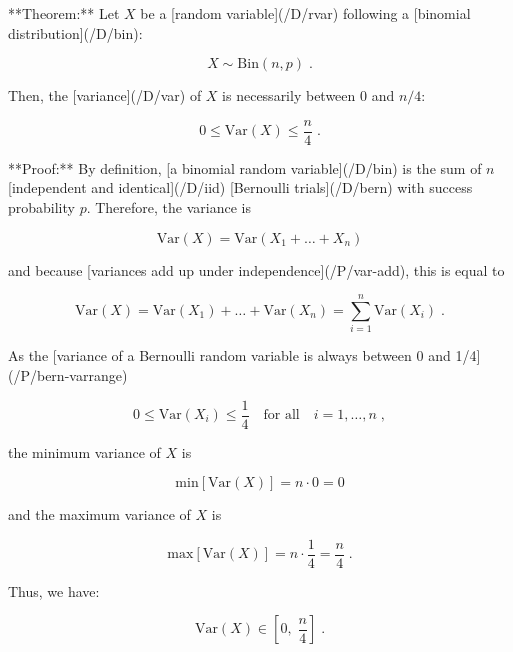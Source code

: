 \documentclass[a4paper,12pt]{article}
\begin{document}
**Theorem:** Let $X$ be a [random variable](/D/rvar) following a [binomial distribution](/D/bin):

$$ \label{eq:bin}
X \sim \mathrm{Bin}(n,p) \; .
$$

Then, the [variance](/D/var) of $X$ is necessarily between 0 and $n/4$:

$$ \label{eq:bin-var-range}
0 \leq \mathrm{Var}(X) \leq \frac{n}{4} \; .
$$


**Proof:** By definition, [a binomial random variable](/D/bin) is the sum of $n$ [independent and identical](/D/iid) [Bernoulli trials](/D/bern) with success probability $p$. Therefore, the variance is

$$ \label{eq:bin-var-s1}
\mathrm{Var}(X) = \mathrm{Var}(X_1 + \ldots + X_n)
$$

and because [variances add up under independence](/P/var-add), this is equal to

$$ \label{eq:bin-var-s2}
\mathrm{Var}(X) = \mathrm{Var}(X_1) + \ldots + \mathrm{Var}(X_n) = \sum_{i=1}^{n} \mathrm{Var}(X_i) \; .
$$

As the [variance of a Bernoulli random variable is always between 0 and 1/4](/P/bern-varrange)

$$ \label{eq:bern-var-range}
0 \leq \mathrm{Var}(X_i) \leq \frac{1}{4} \quad \text{for all} \quad i = 1,\ldots,n \; ,
$$

the minimum variance of $X$ is

$$ \label{eq:bin-var-min}
\mathrm{min}\left[\mathrm{Var}(X)\right] = n \cdot 0 = 0
$$

and the maximum variance of $X$ is

$$ \label{eq:bin-var-max}
\mathrm{max}\left[\mathrm{Var}(X)\right] = n \cdot \frac{1}{4} = \frac{n}{4} \; .
$$

Thus, we have:

$$ \label{eq:bin-var-int}
\mathrm{Var}(X) \in \left[ 0, \; \frac{n}{4} \right] \; .
$$
\end{document}
